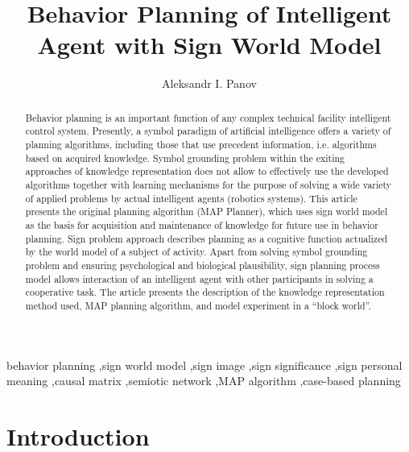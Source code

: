 \documentclass[review]{elsarticle}
\begin{document}
\begin{frontmatter}

\title{Behavior Planning of Intelligent Agent with Sign World Model}

\author{Aleksandr I. Panov}

\address{Federal Research Center ``Computer Science and Control'' of RAS\\pr. 60-letiya Octyabrya 9, Moscow, Russia}

\begin{abstract}
Behavior planning is an important function of any complex technical facility intelligent control system. Presently, a symbol paradigm of artificial intelligence offers a variety of planning algorithms, including those that use precedent information, i.e. algorithms based on acquired knowledge. Symbol grounding problem within the exiting approaches of knowledge representation does not allow to effectively use the developed algorithms together with learning mechanisms for the purpose of solving a wide variety of applied problems by actual intelligent agents (robotics systems). This article presents the original planning algorithm (MAP Planner), which uses sign world model as the basis for acquisition and maintenance of knowledge for future use in behavior planning. Sign problem approach describes planning as a cognitive function actualized by the world model of a subject of activity. Apart from solving symbol grounding problem and ensuring psychological and biological plausibility, sign planning process model allows interaction of an intelligent agent with other participants in solving a cooperative task. The article presents the description of the knowledge representation method used, MAP planning algorithm, and model experiment in a ``block world''.
\end{abstract}

\begin{keyword}
behavior planning \sep sign world model \sep sign image \sep sign significance \sep sign personal meaning \sep causal matrix \sep semiotic network \sep MAP algorithm \sep case-based planning
\end{keyword}

\end{frontmatter}

\linenumbers

\section{Introduction}\label{sec:intro}
\end{document}
